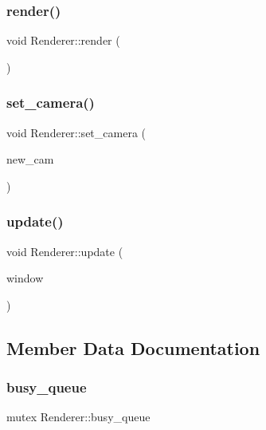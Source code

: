 \subsubsection{\texorpdfstring{render()}{render()}}
{\footnotesize\ttfamily void Renderer\+::render (\begin{DoxyParamCaption}{ }\end{DoxyParamCaption})}

\mbox{\label{classRenderer_a6d8650dd5617e17865aaab8ce409642b}} 
\subsubsection{\texorpdfstring{set\+\_\+camera()}{set\_camera()}}
{\footnotesize\ttfamily void Renderer\+::set\+\_\+camera (\begin{DoxyParamCaption}\item[{\mbox{\hyperlink{classCamera}{Camera}} $\ast$}]{new\+\_\+cam }\end{DoxyParamCaption})}

\mbox{\label{classRenderer_a34ac63c7fe0611ece146dc504aecb815}} 
\subsubsection{\texorpdfstring{update()}{update()}}
{\footnotesize\ttfamily void Renderer\+::update (\begin{DoxyParamCaption}\item[{G\+L\+F\+Wwindow $\ast$}]{window }\end{DoxyParamCaption})}



\subsection{Member Data Documentation}
\mbox{\label{classRenderer_a044abbf0e0cbe0446bec0d0f00b2d060}} 
\subsubsection{\texorpdfstring{busy\+\_\+queue}{busy\_queue}}
{\footnotesize\ttfamily mutex Renderer\+::busy\+\_\+queue}

